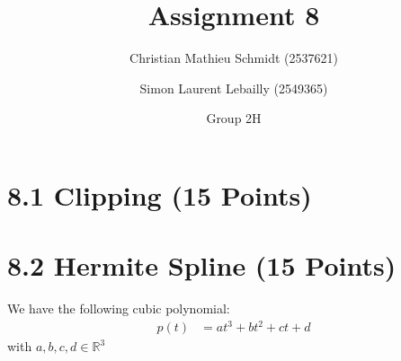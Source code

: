 \documentclass{article}
\title{Assignment 8}
\author{Christian Mathieu Schmidt (2537621)
\and Simon Laurent Lebailly (2549365)\\
\and Group 2H}
\begin{document}
\maketitle


\section*{8.1 Clipping (15 Points)} \label{ex1}




\newpage
\section*{8.2 Hermite Spline (15 Points)} \label{ex2}
    We have the following cubic polynomial:
        \begin{align}
            p(t) &= at^3 + bt^2 + ct + d
        \end{align}
    with $a,b,c,d \in \mathbb{R}^3$
    
\end{document}
